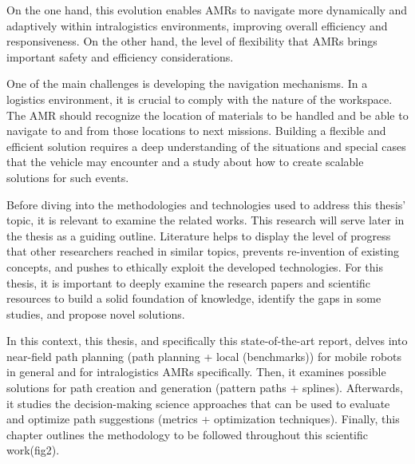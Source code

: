 On the one hand, this evolution enables AMRs to navigate more dynamically and adaptively 
within intralogistics environments, improving overall efficiency and responsiveness. 
On the other hand, the level of flexibility that AMRs brings important safety and 
efficiency considerations.

One of the main challenges is developing the navigation mechanisms. In a logistics 
environment, it is crucial to comply with the nature of the workspace. The AMR should 
recognize the location of materials to be handled and be able to navigate to and from 
those locations to next missions. Building a flexible and efficient solution requires a 
deep understanding of the situations and special cases that the vehicle may encounter 
and a study about how to create scalable solutions for such events.  

Before diving into the methodologies and technologies used to address this thesis’ 
topic, it is relevant to examine the related works. This research will serve later in 
the thesis as a guiding outline. Literature helps to display the level of progress that 
other researchers reached in similar topics, prevents re-invention of existing concepts, 
and pushes to ethically exploit the developed technologies. For this thesis, it is 
important to deeply examine the research papers and scientific resources to build a 
solid foundation of knowledge, identify the gaps in some studies, and propose novel 
solutions.  

In this context, this thesis, and specifically this state-of-the-art report, delves 
into near-field path planning (path planning + local (benchmarks)) for mobile robots 
in general and for intralogistics AMRs specifically. Then, it examines possible 
solutions for path creation and generation (pattern paths + splines). Afterwards, 
it studies the decision-making science approaches that can be used to evaluate and 
optimize path suggestions (metrics + optimization techniques). Finally, this chapter 
outlines the methodology to be followed throughout this scientific work(fig2).  
